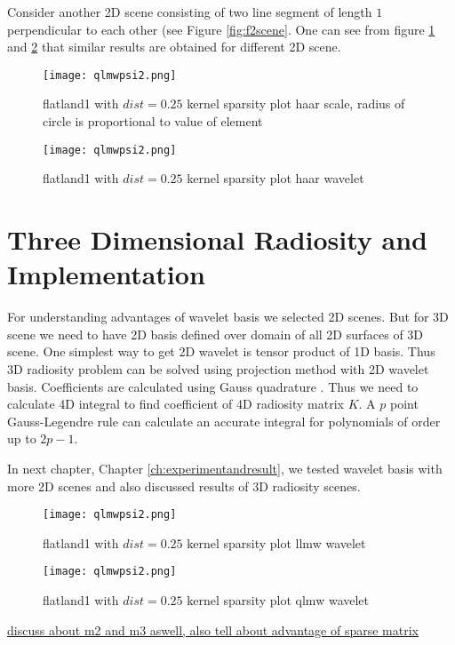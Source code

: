 Consider another 2D scene consisting of two line segment of length $1$ perpendicular to each other (see Figure \ref{fig:f2scene}. One can see from figure \ref{fig:haarscalesparsef2} and \ref{fig:haarwaveletsparsef2} that similar results are obtained for different 2D scene.

\begin{figure}[tbh]
\centering{}
\captionsetup{justification=centering}
\texttt{[image: qlmwpsi2.png]}
\caption{\label{fig:haarscalesparsef2}flatland1 with $dist=0.25$ kernel sparsity plot haar scale, radius of circle is proportional to value of element}
\end{figure}
\begin{figure}[tbh]
\centering{}
\captionsetup{justification=centering}
\texttt{[image: qlmwpsi2.png]}
\caption{\label{fig:haarwaveletsparsef2}flatland1 with $dist=0.25$ kernel sparsity plot haar wavelet}
\end{figure}

\section{Three Dimensional Radiosity and Implementation}
For understanding advantages of wavelet basis we selected 2D scenes. But for 3D scene we need to have 2D basis defined over domain of all 2D surfaces of 3D scene. One simplest way to get 2D wavelet is tensor product of 1D basis. Thus 3D radiosity problem can be solved using projection method with 2D wavelet basis. Coefficients are calculated using Gauss quadrature \cite{stoer}. Thus we need to calculate 4D integral to find coefficient of 4D radiosity matrix $K$. A $p$ point  Gauss-Legendre rule can calculate an accurate integral for polynomials of order up to  $2p-1$.

In next chapter, Chapter \ref{ch:experimentandresult}, we tested wavelet basis with more 2D scenes and also discussed results of 3D radiosity scenes.




\begin{figure}[tbh]
\centering{}
\captionsetup{justification=centering}
\texttt{[image: qlmwpsi2.png]}
\caption{\label{fig:replacethis7}flatland1 with $dist=0.25$ kernel sparsity plot llmw wavelet}
\end{figure}

\begin{figure}[tbh]
\centering{}
\captionsetup{justification=centering}
\texttt{[image: qlmwpsi2.png]}
\caption{\label{fig:replacethis8}flatland1 with $dist=0.25$ kernel sparsity plot qlmw wavelet}
\end{figure}
\underline{discuss about m2 and m3 aswell, also tell about advantage of sparse matrix}

